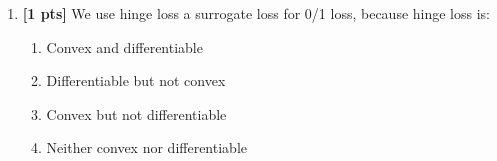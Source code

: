 \begin{enumerate}[noitemsep]
    \hfill \linebreak
    \item \textbf{[1 pts]} We use hinge loss a surrogate loss for 0/1 loss, because hinge loss is:
    \begin{enumerate}
        \item Convex and differentiable
        \item Differentiable but not convex
        \item Convex but not differentiable 
        \item Neither convex nor differentiable 
    \end{enumerate}

    \begin{soln}
    \end{soln}
    
\end{enumerate}



